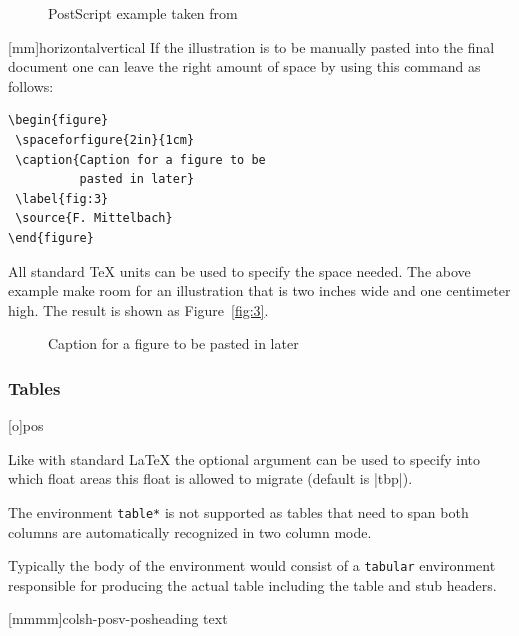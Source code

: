 \begin{figure}
\caption{PostScript example taken from~\cite{A-W:MG04}}
\label{fig:b}
\end{figure}

[mm]{horizontal}{vertical}
If the illustration is to be manually pasted into the final document
one can leave the right amount of space by using this command as
follows:
\begin{verbatim}
\begin{figure}
 \spaceforfigure{2in}{1cm}
 \caption{Caption for a figure to be
          pasted in later}
 \label{fig:3}
 \source{F. Mittelbach}
\end{figure}
\end{verbatim}
All standard \TeX{} units can be used to specify the space needed. The
above example make room for an illustration that is two inches wide and
one centimeter high. The result is shown as Figure~\vref{fig:3}.

\begin{figure}
 \spaceforfigure{2in}{1cm}
 \caption{Caption for a figure to be
          pasted in later}
 \label{fig:3}
\end{figure}

\subsubsection{Tables}

[o]{pos}

Like with standard \LaTeX{} the optional  argument can be
used to specify into which float areas this float is allowed to
migrate (default is |tbp|).

The environment \texttt{table*} is not supported as tables that need
to span both columns are automatically recognized in two column mode.

Typically the body of the environment would consist of a
\texttt{tabular} environment responsible for producing the actual
table including the table and stub headers.

[mmmm]{cols}{h-pos}{v-pos}{heading text}


